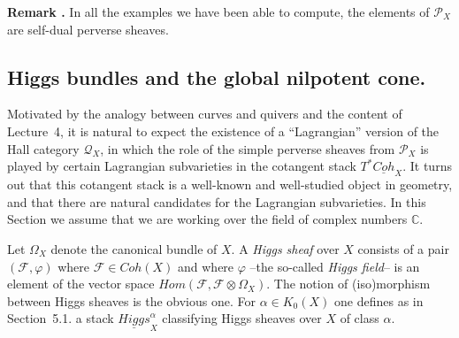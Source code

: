 \documentclass[a4paper,10pt]{amsart}
\def\a{\alpha}
\numberwithin{equation}{section}
\begin{document}
\vspace{.2in}

\addtocounter{theo}{1}
\noindent \textbf{Remark \thetheo .} In all the examples we have been able to compute, the elements of $\mathcal{P}_X$ are self-dual perverse sheaves. 

\vspace{.3in}

\subsection{Higgs bundles and the global nilpotent cone.}

\vspace{.15in}

Motivated by the analogy between curves and quivers and the content of Lecture~4, it is natural to expect the existence of a ``Lagrangian'' version of the Hall category $\mathcal{Q}_X$, in which the role of the simple perverse sheaves from $\mathcal{P}_X$ is played by certain Lagrangian subvarieties
in the cotangent stack $T^*\underline{Coh}_X$. It turns out that this cotangent stack is a well-known and well-studied object in geometry, and that there are natural candidates for the Lagrangian subvarieties.
In this Section we assume that we are working over the field of complex numbers $\mathbb{C}$.

\vspace{.2in}

Let $\Omega_X$ denote the canonical bundle of $X$. A \textit{Higgs sheaf} over $X$ consists of a pair $(\mathcal{F}, \varphi)$ where $\mathcal{F} \in Coh(X)$ and where $\varphi$ --the so-called \textit{Higgs field}-- is an element of the vector space $Hom(\mathcal{F}, \mathcal{F} \otimes \Omega_X)$. The notion of (iso)morphism between Higgs sheaves is the obvious one. For $\a \in K_0(X)$ one defines as in Section~5.1. a stack $\underline{Higgs}^{\a}_X$ classifying Higgs sheaves over $X$ of class $\a$.

\vspace{.1in}
\end{document}
